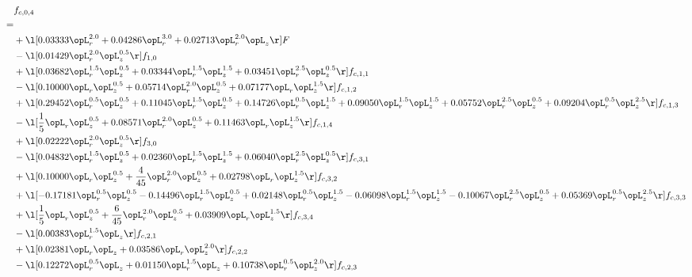 \begin{alignat}{2} 
\label{eq:f_04_2} 
& f_{c,0,4} \nonumber \\ 
 = \\ 
& + \l[  0.03333 \opL_r^{2.0} +  0.04286 \opL_r^{3.0} +  0.02713 \opL_r^{2.0} \opL_z  \r] F \nonumber \\ 
& - \l[  0.01429 \opL_r^{2.0} \opL_z^{0.5}  \r] f_{1,0} \nonumber \\ 
& + \l[  0.03682 \opL_r^{1.5} \opL_z^{0.5} +  0.03344 \opL_r^{1.5} \opL_z^{1.5} +  0.03451 \opL_r^{2.5} \opL_z^{0.5}  \r] f_{c,1,1} \nonumber \\ 
& - \l[  0.10000 \opL_r \opL_z^{0.5} +  0.05714 \opL_r^{2.0} \opL_z^{0.5} +  0.07177 \opL_r \opL_z^{1.5}  \r] f_{c,1,2} \nonumber \\ 
& + \l[  0.29452 \opL_r^{0.5} \opL_z^{0.5} +  0.11045 \opL_r^{1.5} \opL_z^{0.5} +  0.14726 \opL_r^{0.5} \opL_z^{1.5} +  0.09050 \opL_r^{1.5} \opL_z^{1.5} +  0.05752 \opL_r^{2.5} \opL_z^{0.5} +  0.09204 \opL_r^{0.5} \opL_z^{2.5}  \r] f_{c,1,3} \nonumber \\ 
& - \l[ \frac{1}{5} \opL_r \opL_z^{0.5} +  0.08571 \opL_r^{2.0} \opL_z^{0.5} +  0.11463 \opL_r \opL_z^{1.5}  \r] f_{c,1,4} \nonumber \\ 
& + \l[  0.02222 \opL_r^{2.0} \opL_z^{0.5}  \r] f_{3,0} \nonumber \\ 
& - \l[  0.04832 \opL_r^{1.5} \opL_z^{0.5} +  0.02360 \opL_r^{1.5} \opL_z^{1.5} +  0.06040 \opL_r^{2.5} \opL_z^{0.5}  \r] f_{c,3,1} \nonumber \\ 
& + \l[  0.10000 \opL_r \opL_z^{0.5} + \frac{4}{45} \opL_r^{2.0} \opL_z^{0.5} +  0.02798 \opL_r \opL_z^{1.5}  \r] f_{c,3,2} \nonumber \\ 
& + \l[  -0.17181 \opL_r^{0.5} \opL_z^{0.5}   -0.14496 \opL_r^{1.5} \opL_z^{0.5} +  0.02148 \opL_r^{0.5} \opL_z^{1.5}   -0.06098 \opL_r^{1.5} \opL_z^{1.5}   -0.10067 \opL_r^{2.5} \opL_z^{0.5} +  0.05369 \opL_r^{0.5} \opL_z^{2.5}  \r] f_{c,3,3} \nonumber \\ 
& + \l[ \frac{1}{5} \opL_r \opL_z^{0.5} + \frac{6}{45} \opL_r^{2.0} \opL_z^{0.5} +  0.03909 \opL_r \opL_z^{1.5}  \r] f_{c,3,4} \nonumber \\ 
& - \l[  0.00383 \opL_r^{1.5} \opL_z  \r] f_{c,2,1} \nonumber \\ 
& + \l[  0.02381 \opL_r \opL_z +  0.03586 \opL_r \opL_z^{2.0}  \r] f_{c,2,2} \nonumber \\ 
& - \l[  0.12272 \opL_r^{0.5} \opL_z +  0.01150 \opL_r^{1.5} \opL_z +  0.10738 \opL_r^{0.5} \opL_z^{2.0}  \r] f_{c,2,3} \nonumber \\ 

\end{alignat}
